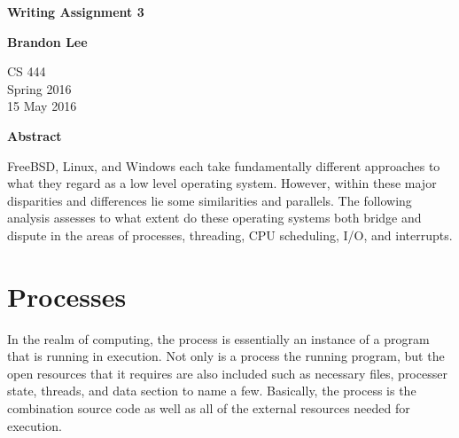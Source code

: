 \documentclass[letterpaper,10pt,titlepage]{article}
\begin{document}
\begin{titlepage}
    \begin{center}
        \vspace*{3.5cm}

        \textbf{Writing Assignment 3}

        \vspace{0.5cm}

        \textbf{Brandon Lee}

        \vspace{0.8cm}

        CS 444\\
        Spring 2016\\
        15 May 2016\\

        \vspace{1cm}

        \textbf{Abstract}\\

        \vspace{0.5cm}

        FreeBSD, Linux, and Windows each take fundamentally different approaches to what they regard as a low level operating system.  However, within these major disparities and differences lie some similarities and parallels.  The following analysis assesses to what extent do these operating systems both bridge and dispute in the areas of processes, threading, CPU scheduling, I/O, and interrupts.

        \vfill

    \end{center}
\end{titlepage}

\newpage

\tableofcontents

\newpage

\section{Processes}

In the realm of computing, the process is essentially an instance of a program that is running in execution.  Not only is a process the running program, but the open resources that it requires are also included such as necessary files, processer state, threads, and data section to name a few.  Basically, the process is the combination source code as well as all of the external resources needed for execution.
\end{document}
